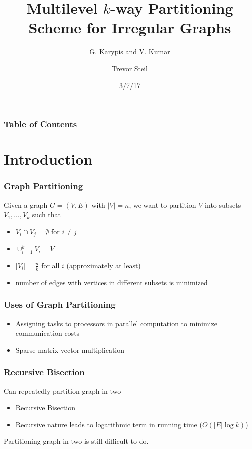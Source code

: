 \documentclass{beamer}
\title{Multilevel $k$-way Partitioning Scheme for Irregular Graphs}
\subtitle{G. Karypis and V. Kumar}
\date{3/7/17}
\author{Trevor Steil}
\begin{document}
\begin{frame}
  \titlepage
\end{frame}

\begin{frame}
  \frametitle{Table of Contents}
  \tableofcontents
\end{frame}

\section{Introduction}
\begin{frame}
  \frametitle{Graph Partitioning}

  Given a graph $G = (V, E)$ with $|V|=n$, we want to partition $V$ into subsets $V_1, \dots, V_k$ such that
  \begin{itemize}
    \item $V_i \cap V_j = \emptyset$ for $i \neq j$
    \item $\cup_{i=1}^k V_i = V$
    \item $|V_i| = \frac{n}{k}$ for all $i$ (approximately at least)
    \item number of edges with vertices in different subsets is minimized
  \end{itemize}
\end{frame}

\begin{frame}
  \frametitle{Uses of Graph Partitioning}

  \begin{itemize}
    \item Assigning tasks to processors in parallel computation to minimize communication costs
    \item Sparse matrix-vector multiplication
  \end{itemize}
\end{frame}

\begin{frame}
  \frametitle{Recursive Bisection}

  Can repeatedly partition graph in two
  \begin{itemize}
    \item Recursive Bisection
    \item Recursive nature leads to logarithmic term in running time ($O(|E| \log k)$)
  \end{itemize}

  Partitioning graph in two is still difficult to do.

\end{frame}
\end{document}
